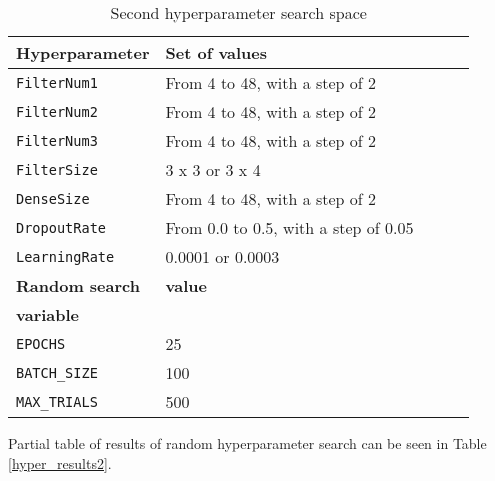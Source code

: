 \begin{table}
    \centering
    \caption{ Second hyperparameter search space}
    \begin{tabular}{@{} *5l @{}}    \toprule
        \textbf{Hyperparameter} & \textbf{Set of values}\\\midrule
        \verb|FilterNum1|       & From 4 to 48, with a step of 2\\ 
        \verb|FilterNum2|       & From 4 to 48, with a step of 2\\ 
        \verb|FilterNum3|       & From 4 to 48, with a step of 2\\
        \verb|FilterSize|       & 3 x 3 or 3 x 4\\
        \verb|DenseSize|        & From 4 to 48, with a step of 2\\
        \verb|DropoutRate|      & From 0.0 to 0.5, with a step of 0.05\\
        \verb|LearningRate|     & 0.0001 or 0.0003\\\toprule
        \textbf{Random search}  & \textbf{value}\\
        \textbf{variable}       & \\\midrule
        \verb|EPOCHS|           & 25\\
        \verb|BATCH_SIZE|       & 100\\
        \verb|MAX_TRIALS|       & 500\\\bottomrule
    \end{tabular}
    \label{hyper_table2}
\end{table}

Partial table of results of random hyperparameter search can be seen in Table \ref{hyper_results2}.

